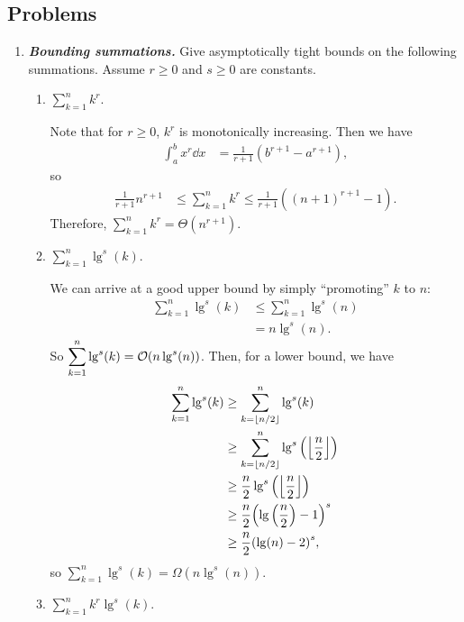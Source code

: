 \documentclass[AppendixA]{subfiles}
\begin{document}
	\subsection*{Problems}

	\begin{enumerate}[leftmargin=\labelsep,label={\textbf{\thesection-\arabic*}}]
		\item \textbf{\textit{Bounding summations.}} Give asymptotically tight bounds on the following summations. Assume $r \geq 0$ and $s \geq 0$ are constants.
		\begin{enumerate}
			\item $\displaystyle \sum_{k = 1}^n k^r$.
			\begin{answer}
				Note that for $r \geq 0$, $k^r$ is monotonically increasing. Then we have
				\begin{align*}
					\int_a^b x^r \dd x &= \frac{1}{r + 1}(b^{r + 1} - a^{r + 1}),
				\end{align*}
				so
				\begin{align*}
					\frac{1}{r + 1} n^{r + 1} &\leq \sum_{k = 1}^n k^r \leq \frac{1}{r + 1}((n + 1)^{r + 1} - 1).
				\end{align*}
				Therefore, $\displaystyle \sum_{k = 1}^n k^r = \Theta(n^{r + 1})$.
			\end{answer}

			\item \label{exer:appA-log-sum-bound} $\displaystyle \sum_{k = 1}^n \lg^s(k)$.
			\begin{answer}
				We can arrive at a good upper bound by simply ``promoting'' $k$ to $n$:
				\begin{align*}
					\sum_{k = 1}^n \lg^s(k) &\leq \sum_{k = 1}^n \lg^s(n)\\
						&= n\lg^s(n).
				\end{align*}
				So $\displaystyle \sum_{k = 1}^n \lg^s(k) = \mathcal{O}(n\lg^s(n))$. Then, for a lower bound, we have
				\begin{align*}
					\sum_{k = 1}^n \lg^s(k) &\geq \sum_{k = \lfloor n / 2 \rfloor}^n \lg^s(k)\\
						&\geq \sum_{k = \lfloor n / 2 \rfloor}^n \lg^s \qty(\left\lfloor \frac{n}{2} \right\rfloor)\\
						&\geq \frac{n}{2} \lg^s\qty(\left\lfloor \frac{n}{2} \right\rfloor)\\
						&\geq \frac{n}{2} \qty(\lg \qty(\frac{n}{2}) - 1)^s\\
						&\geq \frac{n}{2} \qty(\lg(n) - 2)^s,
				\end{align*}
				so $\displaystyle \sum_{k = 1}^n \lg^s(k) = \Omega(n\lg^s(n))$.
			\end{answer}
			
			\item $\displaystyle \sum_{k = 1}^n k^r\lg^s(k)$.
			\begin{answer}
				
			\end{answer}
			
		\end{enumerate}
	\end{enumerate}
\end{document}
